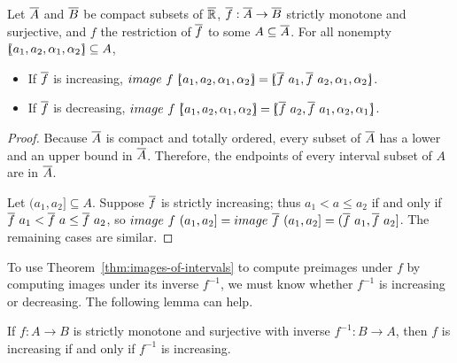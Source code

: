 \begin{theorem}
\label{thm:images-of-intervals}
Let $\cl{A}$ and $\cl{B}$ be compact subsets of $\cl{\Re}$, $\cl{f} : \cl{A} \to \cl{B}$ strictly monotone and surjective, and $f$ the restriction of $\cl{f}$ to some $A \subseteq \cl{A}$.
For all nonempty $[\mspace{-4.5mu}(a_1,a_2,\alpha_1,\alpha_2)\mspace{-4.5mu}] \subseteq A$,
\begin{itemize}
	\item If $\cl{f}$ is increasing, $image~f~\ivl{a_1,a_2,\alpha_1,\alpha_2} = \ivl{\cl{f}~a_1, \cl{f}~a_2,\alpha_1,\alpha_2}$.
	\item If $\cl{f}$ is decreasing, $image~f~\ivl{a_1,a_2,\alpha_1,\alpha_2} = \ivl{\cl{f}~a_2, \cl{f}~a_1,\alpha_2,\alpha_1}$.
\end{itemize}
\end{theorem}
\begin{proof}
Because $\cl{A}$ is compact and totally ordered, every subset of $\cl{A}$ has a lower and an upper bound in $\cl{A}$.
Therefore, the endpoints of every interval subset of $A$ are in $\cl{A}$.

Let $(a_1,a_2] \subseteq A$.
Suppose $\cl{f}$ is strictly increasing; thus $a_1 < a \leq a_2$ if and only if $\cl{f}~a_1 < \cl{f}~a \leq \cl{f}~a_2$, so $image~f~(a_1,a_2] = image~\cl{f}~(a_1,a_2] = (\cl{f}~a_1,\cl{f}~a_2]$.
The remaining cases are similar.
\end{proof}

To use Theorem~\ref{thm:images-of-intervals} to compute preimages under $f$ by computing images under its inverse $f^{-1}$, we must know whether $f^{-1}$ is increasing or decreasing.
The following lemma can help.

\begin{lemma}
\label{lem:inverse-direction}
If $f : A \to B$ is strictly monotone and surjective with inverse $f^{-1} : B \to A$, then $f$ is increasing if and only if $f^{-1}$ is increasing.
\end{lemma}

